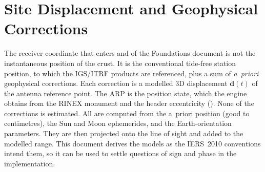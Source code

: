 \documentclass[main.tex]{subfiles}
\begin{document}
\section{Site Displacement and Geophysical Corrections}\label{sec:sitedisp}

\newcommand{\disp}{\bm{d}}                       %
\newcommand{\dispSET}{\disp_{\mathrm{SET}}}      %
\newcommand{\dispOTL}{\disp_{\mathrm{OTL}}}      %
\newcommand{\dispPT}{\disp_{\mathrm{PT}}}        %
\newcommand{\dispOPT}{\disp_{\mathrm{OPT}}}      %
\newcommand{\dispAPL}{\disp_{\mathrm{APL}}}      %
\newcommand{\leftmoon}{\mathrm{m}}               %
\newcommand{\rxsun}{\bm{r}^{\odot}}              %
\newcommand{\rxmoon}{\bm{r}^{\leftmoon}}         %
\newcommand{\loveh}{h}                              %
\newcommand{\shidal}{l}                              %
\newcommand{\geolat}{\varphi}                    %
\newcommand{\geolon}{\lambda}                    %
\newcommand{\unitup}{\hat{\bm{u}}}               %
\newcommand{\polem}[1]{m_{#1}}                   %

The receiver coordinate that enters  and 
of the Foundations document is not the instantaneous position of the
crust.  It is the conventional tide-free station position, to which the
IGS/ITRF products are referenced, plus a sum of \emph{a~priori}
geophysical corrections.  Each correction is a modelled 3D displacement
$\disp(t)$ of the antenna reference point.  The ARP is the position
state, which the engine obtains from the RINEX monument and the header
eccentricity ().  None of the corrections is estimated.
All are computed from the a~priori position (good to centimetres), the
Sun and Moon ephemerides, and the Earth-orientation parameters.  They
are then projected onto the line of sight and added to the modelled
range.  This document derives the models as the IERS~2010 conventions
\cite{iers2010} intend them, so it can be used to settle questions of
sign and phase in the implementation.
\end{document}
